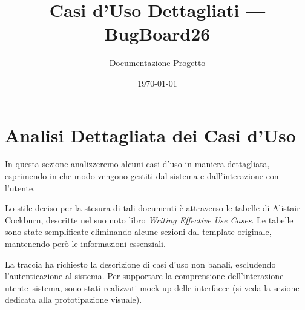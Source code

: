 \documentclass[12pt,a4paper]{article}
\title{Casi d'Uso Dettagliati --- BugBoard26}
\author{Documentazione Progetto}
\date{\today}
\begin{document}
\maketitle

\section{Analisi Dettagliata dei Casi d'Uso}

In questa sezione analizzeremo alcuni casi d'uso in maniera dettagliata, esprimendo in che modo vengono gestiti dal sistema e dall'interazione con l'utente.

Lo stile deciso per la stesura di tali documenti è attraverso le tabelle di Alistair Cockburn, descritte nel suo noto libro \textit{Writing Effective Use Cases}. Le tabelle sono state semplificate eliminando alcune sezioni dal template originale, mantenendo però le informazioni essenziali.

La traccia ha richiesto la descrizione di casi d'uso non banali, escludendo l'autenticazione al sistema. Per supportare la comprensione dell'interazione utente--sistema, sono stati realizzati mock-up delle interfacce (si veda la sezione dedicata alla prototipazione visuale).


\end{document}
